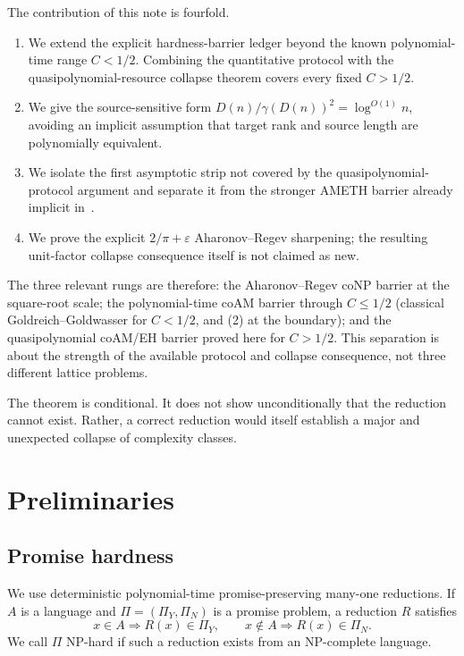 \documentclass[11pt]{article}
\begin{document}
The contribution of this note is fourfold.
\begin{enumerate}
  \item We extend the explicit hardness-barrier ledger beyond the known
  polynomial-time range $C<1/2$.  Combining the quantitative protocol with
  the quasipolynomial-resource collapse theorem covers every fixed $C>1/2$.
  \item We give the source-sensitive form
  $D(n)/\gamma(D(n))^2=\log^{O(1)}n$, avoiding an implicit assumption that
  target rank and source length are polynomially equivalent.
  \item We isolate the first asymptotic strip not covered by the
  quasipolynomial-protocol argument and separate it from the stronger AMETH
  barrier already implicit in~\cite{ABBGKLPV22}.
  \item We prove the explicit $2/\pi+\varepsilon$ Aharonov--Regev sharpening;
  the resulting unit-factor collapse consequence itself is not claimed as
  new.
\end{enumerate}

The three relevant rungs are therefore: the Aharonov--Regev coNP barrier at
the square-root scale; the polynomial-time coAM barrier through $C\le1/2$
(classical Goldreich--Goldwasser for $C<1/2$, and (2) at the boundary); and
the quasipolynomial coAM/EH barrier proved here for $C>1/2$.  This separation
is about the strength of the available protocol and collapse consequence,
not three different lattice problems.

The theorem is conditional.  It does not show unconditionally that the
reduction cannot exist.  Rather, a correct reduction would itself establish
a major and unexpected collapse of complexity classes.

\section{Preliminaries}

\subsection{Promise hardness}

We use deterministic polynomial-time promise-preserving many-one reductions.
If $A$ is a language and $\Pi=(\Pi_Y,\Pi_N)$ is a promise problem, a reduction
$R$ satisfies
\[
  x\in A\Rightarrow R(x)\in\Pi_Y,
  \qquad
  x\notin A\Rightarrow R(x)\in\Pi_N.
\]
We call $\Pi$ NP-hard if such a reduction exists from an NP-complete language.
\end{document}
